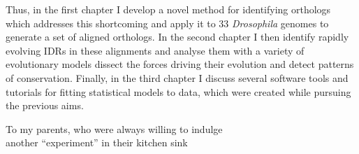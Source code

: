 \documentclass[11pt,letterpaper,oneside]{book}
\begin{document}
Thus, in the first chapter I develop a novel method for identifying orthologs which addresses this shortcoming and apply it to 33 \textit{Drosophila} genomes to generate a set of aligned orthologs. In the second chapter I then identify rapidly evolving IDRs in these alignments and analyse them with a variety of evolutionary models dissect the forces driving their evolution and detect patterns of conservation. Finally, in the third chapter I discuss several software tools and tutorials for fitting statistical models to data, which were created while pursuing the previous aims.

\clearpage
\setcounter{page}{1}  %

\null  %
\vfill
\begin{center}
    To my parents, who were always willing to indulge\\
    another ``experiment'' in their kitchen sink
\end{center}
\vfill
\clearpage
\end{document}
